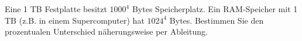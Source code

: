 \item
Eine 1 TB Festplatte besitzt $1000^4$ Bytes Speicherplatz. Ein RAM-Speicher mit 1 TB (z.B. in einem Supercomputer) hat $1024^4$ Bytes. Bestimmen Sie den prozentualen Unterschied näherungsweise per Ableitung.

